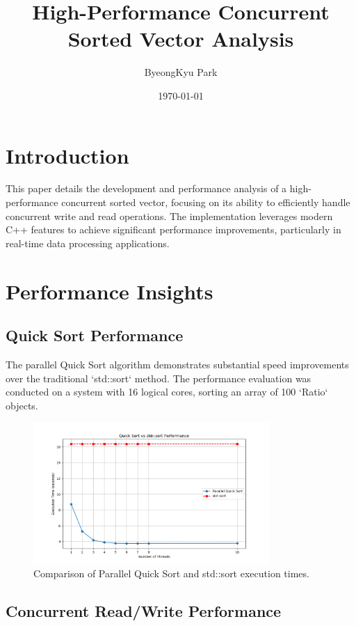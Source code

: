 \documentclass{article}
\title{High-Performance Concurrent Sorted Vector Analysis}
\author{ByeongKyu Park}
\date{\today}
\begin{document}
\maketitle

\section{Introduction}

This paper details the development and performance analysis of a high-performance concurrent sorted vector, focusing on its ability to efficiently handle concurrent write and read operations. The implementation leverages modern C++ features to achieve significant performance improvements, particularly in real-time data processing applications.

\section{Performance Insights}

\subsection{Quick Sort Performance}

The parallel Quick Sort algorithm demonstrates substantial speed improvements over the traditional `std::sort` method. The performance evaluation was conducted on a system with 16 logical cores, sorting an array of 100 `Ratio` objects.

\begin{figure}[h]
\centering
\includegraphics[width=0.8\textwidth]{QuickSortPerformanceComparison.png}
\caption{Comparison of Parallel Quick Sort and std::sort execution times.}
\label{fig:quicksort}
\end{figure}

\subsection{Concurrent Read/Write Performance}
\end{document}
